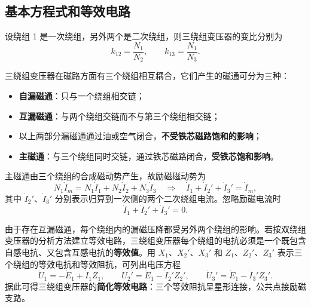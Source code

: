 \subsection{基本方程式和等效电路}
设绕组 1 是一次绕组，另外两个是二次绕组，则三绕组变压器的变比分别为
\begin{equation}
k_{12}=\frac{N_1}{N_2},\qquad k_{13}=\frac{N_1}{N_3}.
\end{equation}

三绕组变压器在磁路方面有三个绕组相互耦合，它们产生的磁通可分为三种：
\begin{itemize}
  \item \textbf{自漏磁通}：只与一个绕组相交链；
  \item \textbf{互漏磁通}：与两个绕组交链而不与第三个绕组相交链；
  \item 以上两部分漏磁通通过油或空气闭合，\textbf{不受铁芯磁路饱和的影响}；
  \item \textbf{主磁通}：与三个绕组同时交链，通过铁芯磁路闭合，\textbf{受铁芯饱和影响}。
\end{itemize}

主磁通由三个绕组的合成磁动势产生，故励磁磁动势为
\begin{equation}
N_1\dot I_m=N_1\dot I_1+N_2\dot I_2+N_3\dot I_3
\quad\Longrightarrow\quad
\dot I_1+\dot I_2'+\dot I_3'=\dot I_m ,
\end{equation}
其中 $\dot I_2'$、$\dot I_3'$ 分别表示归算到一次侧的两个二次绕组电流。忽略励磁电流时
\begin{equation}
\dot I_1+\dot I_2'+\dot I_3'=0 .
\end{equation}

由于存在互漏磁通，每个绕组内的漏磁压降都受另外两个绕组的影响。若按双绕组变压器的分析方法建立等效电路，三绕组变压器每个绕组的电抗必须是一个既包含自感电抗、又包含互感电抗的\textbf{等效值}。用 $X_1$、$X_2'$、$X_3'$ 和 $Z_1$、$Z_2'$、$Z_3'$ 表示三个绕组的等效电抗和等效阻抗，可列出电压方程
\begin{equation}
\dot U_1=-\dot E_1+\dot I_1Z_1,\qquad
\dot U_2'=\dot E_1-\dot I_2'Z_2',\qquad
\dot U_3'=\dot E_1-\dot I_3'Z_3' .
\end{equation}
据此可得三绕组变压器的\textbf{简化等效电路}：三个等效阻抗呈星形连接，公共点接励磁支路。

